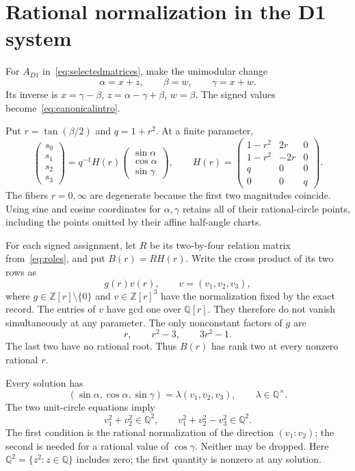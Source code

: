 \documentclass[11pt,letterpaper]{article}
\theoremstyle{definition}\newtheorem{definition}[theorem]{Definition}
\theoremstyle{remark}\newtheorem{remark}[theorem]{Remark}
\newcommand{\Q}{\mathbb Q}\newcommand{\Z}{\mathbb Z}\newcommand{\R}{\mathbb R}
\newcommand{\Qsq}{\Q^{2}}
\begin{document}
\section{Rational normalization in the D1 system}\label{sec:norm}
For $A_{D1}$ in~\eqref{eq:selectedmatrices}, make the unimodular change
\[
 \alpha=x+z,\qquad\beta=w,\qquad\gamma=x+w.
\]
Its inverse is $x=\gamma-\beta$, $z=\alpha-\gamma+\beta$, $w=\beta$. The signed values become~\eqref{eq:canonicalintro}.

Put $r=\tan(\beta/2)$ and $q=1+r^2$. At a finite parameter,
\begin{equation}\label{eq:Hmatrix}
 \begin{pmatrix}s_0\\s_1\\s_2\\s_3\end{pmatrix}
 =q^{-1}H(r)\begin{pmatrix}\sin\alpha\\\cos\alpha\\\sin\gamma\end{pmatrix},
 \qquad
 H(r)=\begin{pmatrix}
 1-r^2&2r&0\\1-r^2&-2r&0\\q&0&0\\0&0&q
 \end{pmatrix}.
\end{equation}
The fibers $r=0,\infty$ are degenerate because the first two magnitudes coincide. Using sine and cosine coordinates for $\alpha,\gamma$ retains all of their rational-circle points, including the points omitted by their affine half-angle charts.

For each signed assignment, let $R$ be its two-by-four relation matrix from~\eqref{eq:roles}, and put $B(r)=RH(r)$. Write the cross product of its two rows as
\[
 g(r)v(r),\qquad v=(v_1,v_2,v_3),
\]
where $g\in\Z[r]\setminus\{0\}$ and $v\in\Z[r]^3$ have the normalization fixed by the exact record. The entries of $v$ have gcd one over $\Q[r]$. They therefore do not vanish simultaneously at any parameter. The only nonconstant factors of $g$ are
\[
 r,\qquad r^2-3,\qquad 3r^2-1.
\]
The last two have no rational root. Thus $B(r)$ has rank two at every nonzero rational $r$.

Every solution has
\[
 (\sin\alpha,\cos\alpha,\sin\gamma)=\lambda(v_1,v_2,v_3),
 \qquad \lambda\in\Q^\times.
\]
The two unit-circle equations imply
\begin{equation}\label{eq:twonorms}
 v_1^2+v_2^2\in\Qsq,
 \qquad
 v_1^2+v_2^2-v_3^2\in\Qsq.
\end{equation}
The first condition is the rational normalization of the direction $(v_1:v_2)$; the second is needed for a rational value of $\cos\gamma$. Neither may be dropped. Here $\Qsq=\{z^2:z\in\Q\}$ includes zero; the first quantity is nonzero at any solution.
\end{document}
